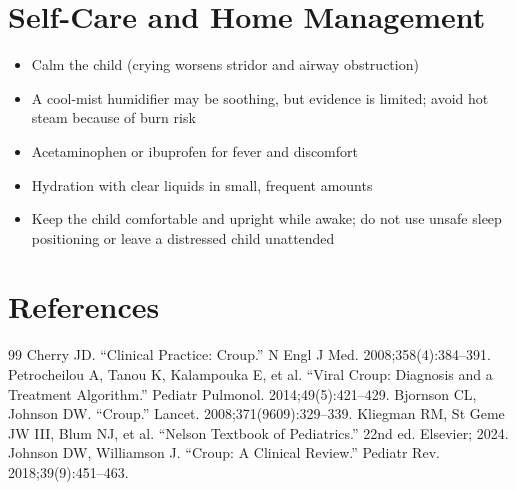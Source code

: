 \section*{Self-Care and Home Management}
\begin{itemize}
  \item Calm the child (crying worsens stridor and airway obstruction)
  \item A cool-mist humidifier may be soothing, but evidence is limited; avoid hot steam because of burn risk
  \item Acetaminophen or ibuprofen for fever and discomfort
  \item Hydration with clear liquids in small, frequent amounts
  \item Keep the child comfortable and upright while awake; do not use unsafe sleep positioning or leave a distressed child unattended
\end{itemize}

\section*{References}
\begin{thebibliography}{99}
 Cherry JD. ``Clinical Practice: Croup.'' N Engl J Med. 2008;358(4):384--391.
 Petrocheilou A, Tanou K, Kalampouka E, et al. ``Viral Croup: Diagnosis and a Treatment Algorithm.'' Pediatr Pulmonol. 2014;49(5):421--429.
 Bjornson CL, Johnson DW. ``Croup.'' Lancet. 2008;371(9609):329--339.
 Kliegman RM, St Geme JW III, Blum NJ, et al. ``Nelson Textbook of Pediatrics.'' 22nd ed. Elsevier; 2024.
 Johnson DW, Williamson J. ``Croup: A Clinical Review.'' Pediatr Rev. 2018;39(9):451--463.
\end{thebibliography}
